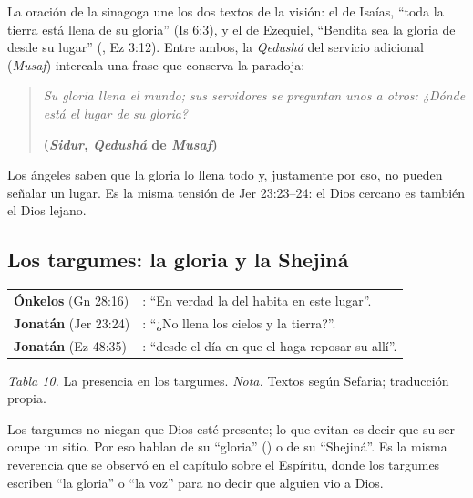 La oración de la sinagoga une los dos textos de la visión: el de Isaías, ``toda la tierra está llena de su gloria'' (Is 6:3), y el de Ezequiel, ``Bendita sea la gloria de \SENOR{} desde su lugar'' (, Ez 3:12). Entre ambos, la \emph{Qedushá} del servicio adicional (\emph{Musaf}) intercala una frase que conserva la paradoja:

\begin{quote}\itshape
Su gloria llena el mundo; sus servidores se preguntan unos a otros: ¿Dónde está el lugar de su gloria?\par\hfill{\upshape\small\bfseries\textcolor{azul}{(\emph{Sidur}, \emph{Qedushá} de \emph{Musaf})}}
\end{quote}

Los ángeles saben que la gloria lo llena todo y, justamente por eso, no pueden señalar un lugar. Es la misma tensión de Jer 23:23--24: el Dios cercano es también el Dios lejano.

\subsection{Los targumes: la gloria y la Shejiná}

\begin{center}\small\renewcommand{\arraystretch}{1.22}
\begin{tabular}{@{}L{3.4cm}L{10.6cm}@{}}
\toprule
\textbf{Ónkelos} (Gn 28:16) & : ``En verdad la  del \SENOR{} habita en este lugar''. \\
\textbf{Jonatán} (Jer 23:24) & : ``¿No llena  los cielos y la tierra?''. \\
\textbf{Jonatán} (Ez 48:35) & : ``desde el día en que el \SENOR{} haga reposar su  allí''. \\
\bottomrule
\end{tabular}\par
{\footnotesize\color{gris}\textit{Tabla 10.} La presencia en los targumes. \textit{Nota.} Textos según Sefaria; traducción propia.}
\end{center}

Los targumes no niegan que Dios esté presente; lo que evitan es decir que su ser ocupe un sitio. Por eso hablan de su ``gloria'' () o de su ``Shejiná''. Es la misma reverencia que se observó en el capítulo sobre el Espíritu, donde los targumes escriben ``la gloria'' o ``la voz'' para no decir que alguien vio a Dios.

